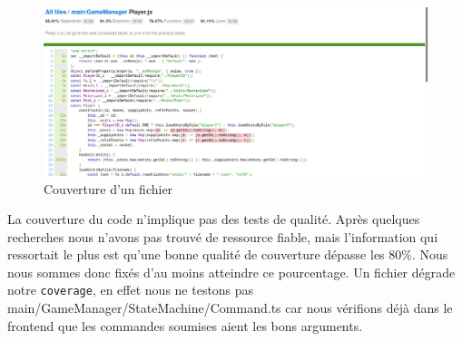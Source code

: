 \begin{figure}[H]
    \centering
    \includegraphics[scale=0.3]{data/couverture_test_2.png}
    \caption{Couverture d'un fichier}
\end{figure}

La couverture du code n'implique pas des tests de qualité. Après quelques recherches nous n'avons pas trouvé de ressource fiable, mais l'information qui ressortait le plus est qu'une bonne qualité de couverture dépasse les 80\%.
Nous nous sommes donc fixés d'au moins atteindre ce pourcentage. Un fichier dégrade notre {\tt coverage}, en effet nous ne testons pas main/GameManager/StateMachine/Command.ts car nous vérifions déjà dans le frontend que les commandes soumises aient les bons arguments.